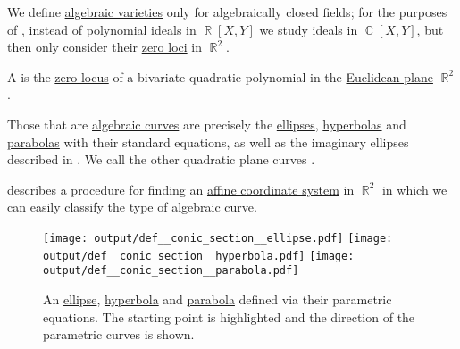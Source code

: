 \begin{remark}\label{rem:real_affine_varieties}
  We define \hyperref[def:affine_algebraic_set/varieties]{algebraic varieties} only for algebraically closed fields; for the purposes of , instead of polynomial ideals in \( \BbbR[X, Y] \) we study ideals in \( \BbbC[X, Y] \), but then only consider their \hyperref[def:zero_locus]{zero loci} in \( \BbbR^2 \).
\end{remark}

\begin{definition}\label{def:quadratic_plane_curve}\mimprovised
  A  is the \hyperref[def:zero_locus]{zero locus} of a bivariate quadratic polynomial in the \hyperref[def:euclidean_plane]{Euclidean plane} \( \BbbR^2 \).

  Those that are \hyperref[def:affine_algebraic_set/curve]{algebraic curves} are precisely the \hyperref[def:ellipse]{ellipses}, \hyperref[def:hyperbola]{hyperbolas} and \hyperref[def:parabola]{parabolas} with their standard equations, as well as the imaginary ellipses described in . We call the other quadratic plane curves .

   describes a procedure for finding an \hyperref[def:affine_coordinate_system]{affine coordinate system} in \( \BbbR^2 \) in which we can easily classify the type of algebraic curve.

  \begin{figure}[!ht]
    \hfill
    \hfill
    \texttt{[image: output/def\_\_conic\_section\_\_ellipse.pdf]}
    \hfill
    \texttt{[image: output/def\_\_conic\_section\_\_hyperbola.pdf]}
    \hfill
    \texttt{[image: output/def\_\_conic\_section\_\_parabola.pdf]}
    \hfill
    \caption{An \hyperref[def:ellipse]{ellipse}, \hyperref[def:hyperbola]{hyperbola} and \hyperref[def:parabola]{parabola} defined via their parametric equations. The starting point is highlighted and the direction of the parametric curves is shown.}\label{fig:def:quadratic_plane_curve}
  \end{figure}
\end{definition}


